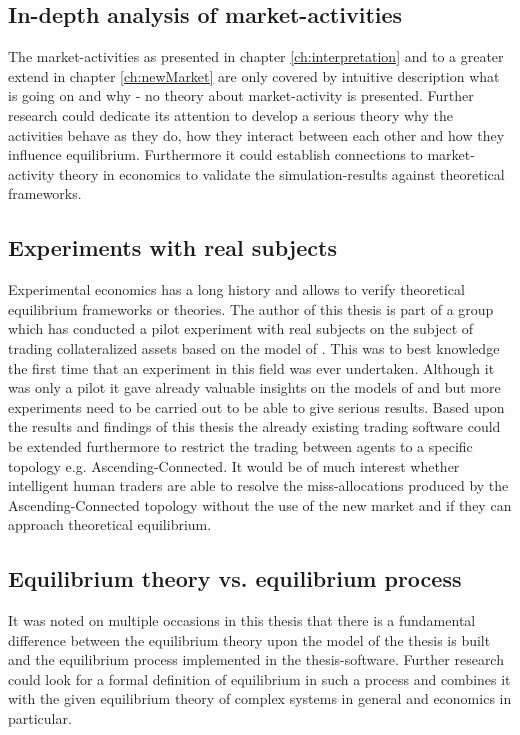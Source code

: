 \documentclass[Bachelorarbeit.tex]{subfiles}
\begin{document}
\subsection{In-depth analysis of market-activities}
The market-activities as presented in chapter \ref{ch:interpretation} and to a greater extend in chapter \ref{ch:newMarket} are only covered by intuitive description what is going on and why - no theory about market-activity is presented. Further research could dedicate its attention to develop a serious theory why the activities behave as they do, how they interact between each other and how they influence equilibrium. Furthermore it could establish connections to market-activity theory in economics to validate the simulation-results against theoretical frameworks.

\subsection{Experiments with real subjects}
Experimental economics has a long history and allows to verify theoretical equilibrium frameworks or theories. The author of this thesis is part of a group which has conducted a pilot experiment with real subjects on the subject of trading collateralized assets based on the model of \cite{Breuer2015}. This was to best knowledge the first time that an experiment in this field was ever undertaken. Although it was only a pilot it gave already valuable insights on the models of \cite{Breuer2015} and \cite{Geanakoplos2009} but more experiments need to be carried out to be able to give serious results. Based upon the results and findings of this thesis the already existing trading software could be extended furthermore to restrict the trading between agents to a specific topology e.g. Ascending-Connected. It would be of much interest whether intelligent human traders are able to resolve the miss-allocations produced by the Ascending-Connected topology without the use of the new market and if they can approach theoretical equilibrium.

\subsection{Equilibrium theory vs. equilibrium process}
It was noted on multiple occasions in this thesis that there is a fundamental difference between the equilibrium theory upon the model of the thesis is built and the equilibrium process implemented in the thesis-software. Further research could look for a formal definition of equilibrium in such a process and combines it with the given equilibrium theory of complex systems in general and economics in particular.
\end{document}
